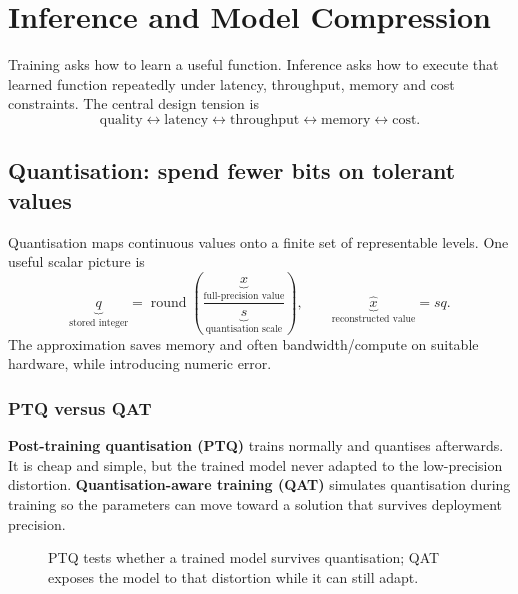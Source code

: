 \chapter{Inference and Model Compression}
\label{chap:inference}
Training asks how to learn a useful function.
Inference asks how to execute that learned function repeatedly under latency, throughput, memory and cost constraints.
The central design tension is
\[
\boxed{
\text{quality}
\longleftrightarrow
\text{latency}
\longleftrightarrow
\text{throughput}
\longleftrightarrow
\text{memory}
\longleftrightarrow
\text{cost}
}.
\]

\section{Quantisation: spend fewer bits on tolerant values}
\label{sec:inference-quantisation}
Quantisation maps continuous values onto a finite set of representable levels.
One useful scalar picture is
\[
\underbrace{q}_{\text{stored integer}}
=
\operatorname{round}\!\left(
\frac{\underbrace{x}_{\text{full-precision value}}}{\underbrace{s}_{\text{quantisation scale}}}
\right),
\qquad
\underbrace{\hat x}_{\text{reconstructed value}}
=sq.
\]
The approximation saves memory and often bandwidth/compute on suitable hardware, while introducing numeric error.

\subsection{PTQ versus QAT}
\label{subsec:inference-ptq-qat}
\textbf{Post-training quantisation (PTQ)} trains normally and quantises afterwards.
It is cheap and simple, but the trained model never adapted to the low-precision distortion.
\textbf{Quantisation-aware training (QAT)} simulates quantisation during training so the parameters can move toward a solution that survives deployment precision.

\begin{figure}[htbp]
\centering
{}
\caption{PTQ tests whether a trained model survives quantisation; QAT exposes the model to that distortion while it can still adapt.}
\end{figure}

